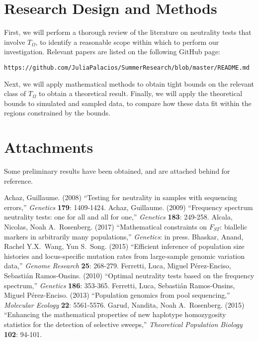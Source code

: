 \documentclass[lettersize, 10.5pt]{article}
\begin{document}
\section*{Research Design and Methods}

First, we will perform a thorough review of the literature on neutrality tests that involve $T_\Omega$, to identify a reasonable scope within which to perform our investigation. Relevant papers are listed on the following GitHub page:
\begin{center}
\texttt{https://github.com/JuliaPalacios/SummerResearch/blob/master/README.md}
\end{center}
Next, we will apply mathematical methods to obtain tight bounds on the relevant class of $T_\Omega$ to obtain a theoretical result. Finally, we will apply the theoretical bounds to simulated and sampled data, to compare how these data fit within the regions constrained by the bounds. 

\section*{Attachments}
Some preliminary results have been obtained, and are attached behind for reference.

\begin{thebibliography}{9}
 Achaz, Guillaume. (2008) ``Testing for neutrality in samples with sequencing errors,'' \textit{Genetics} \textbf{179}: 1409-1424. 
 Achaz, Guillaume. (2009) ``Frequency spectrum neutrality tests: one for all and all for one,'' \textit{Genetics} \textbf{183}: 249-258. 
 Alcala, Nicolas, Noah A.~Rosenberg. (2017) ``Mathematical constraints on $F_{ST}$: biallelic markers in arbitrarily many populations,'' \textit{Genetics}: in press. 
 Bhaskar, Anand, Rachel Y.X.~Wang, Yun S.~Song. (2015) ``Efficient inference of population size histories and locus-specific mutation rates from large-sample genomic variation data,'' \textit{Genome Research} \textbf{25}: 268-279.
 Ferretti, Luca, Miguel P\'erez-Enciso, Sebasti\'an Ramos-Onsins. (2010) ``Optimal neutrality tests based on the frequency spectrum,'' \textit{Genetics} \textbf{186}: 353-365. 
 Ferretti, Luca, Sebasti\'an Ramos-Onsins, Miguel P\'erez-Enciso. (2013) ``Population genomics from pool sequencing,'' \textit{Molecular Ecology} \textbf{22}: 5561-5576. 
 Garud, Nandita, Noah A.~Rosenberg. (2015) ``Enhancing the mathematical properties of new haplotype homozygosity statistics for the detection of selective sweeps,'' \textit{Theoretical Population Biology} \textbf{102}: 94-101.
\end{thebibliography}
\end{document}
